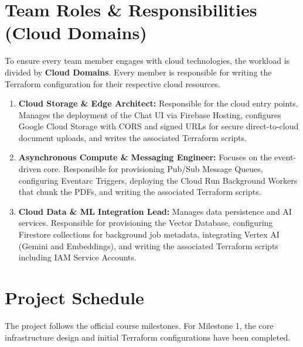 \documentclass[12pt,a4paper]{article}
\begin{document}
\section{Team Roles \& Responsibilities (Cloud Domains)}
To ensure every team member engages with cloud technologies, the workload is divided by \textbf{Cloud Domains}. Every member is responsible for writing the Terraform configuration for their respective cloud resources.

\begin{enumerate}
    \item \textbf{Cloud Storage \& Edge Architect:} Responsible for the cloud entry points. Manages the deployment of the Chat UI via Firebase Hosting, configures Google Cloud Storage with CORS and signed URLs for secure direct-to-cloud document uploads, and writes the associated Terraform scripts.
    \item \textbf{Asynchronous Compute \& Messaging Engineer:} Focuses on the event-driven core. Responsible for provisioning Pub/Sub Message Queues, configuring Eventarc Triggers, deploying the Cloud Run Background Workers that chunk the PDFs, and writing the associated Terraform scripts.
    \item \textbf{Cloud Data \& ML Integration Lead:} Manages data persistence and AI services. Responsible for provisioning the Vector Database, configuring Firestore collections for background job metadata, integrating Vertex AI (Gemini and Embeddings), and writing the associated Terraform scripts including IAM Service Accounts.
\end{enumerate}

\section{Project Schedule}
The project follows the official course milestones. For Milestone 1, the core infrastructure design and initial Terraform configurations have been completed.
\end{document}

